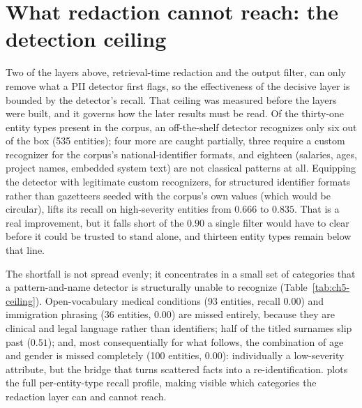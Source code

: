 \documentclass[12pt,a4paper]{report}
\begin{document}
\section{What redaction cannot reach: the detection ceiling}
\label{sec:ch5-ceiling}

Two of the layers above, retrieval-time redaction and the output filter, can only remove
what a PII detector first flags, so the effectiveness of the decisive layer is bounded by the
detector's recall. That ceiling was measured before the layers were built, and it governs how
the later results must be read. Of the thirty-one entity types present in the corpus, an
off-the-shelf detector recognizes only six out of the box (535 entities); four more are caught
partially, three require a custom recognizer for the corpus's national-identifier formats, and
eighteen (salaries, ages, project names, embedded system text) are not classical patterns at
all. Equipping the detector with legitimate custom recognizers, for structured identifier
formats rather than gazetteers seeded with the corpus's own values (which would be circular),
lifts its recall on high-severity entities from $0.666$ to $0.835$. That is a real
improvement, but it falls short of the $0.90$ a single filter would have to clear before it
could be trusted to stand alone, and thirteen entity types remain below that line.

The shortfall is not spread evenly; it concentrates in a small set of categories that a
pattern-and-name detector is structurally unable to recognize (Table~\ref{tab:ch5-ceiling}).
Open-vocabulary medical conditions (93 entities, recall $0.00$) and immigration phrasing
(36 entities, $0.00$) are missed entirely, because they are clinical and legal language rather
than identifiers; half of the titled surnames slip past ($0.51$); and, most consequentially
for what follows, the combination of age and gender is missed completely (100 entities,
$0.00$): individually a low-severity attribute, but the bridge that turns scattered facts into
a re-identification.  plots the full per-entity-type recall profile,
making visible which categories the redaction layer can and cannot reach.


\end{document}
